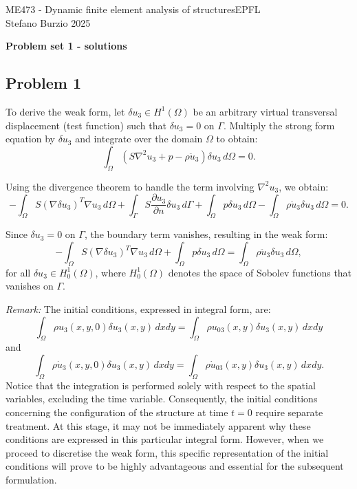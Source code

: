 \documentclass[12pt]{article}
\begin{document}
\noindent ME473 - Dynamic finite element analysis of structures\hfill EPFL\\
Stefano Burzio \hfill 2025\\
\vspace{0.3cm}

\hspace*{\fill}\textbf{\Large Problem set 1 - solutions}\hspace*{\fill}

\hrulefill

\subsection*{Problem 1}
To derive the weak form, let \( \delta u_3 \in H^1(\Omega) \) be an arbitrary virtual transversal displacement (test function) such that \( \delta u_3 = 0 \) on \( \Gamma \). Multiply the strong form equation by \( \delta u_3 \) and integrate over the domain \( \Omega \) to obtain:
\[
    \int_{\Omega} \left( S \nabla^2 u_3 + p - \rho \ddot{u}_3 \right) \delta u_3 \, d\Omega = 0.
\]

Using the divergence theorem to handle the term involving \( \nabla^2 u_3 \), we obtain:
\[
    -\int_{\Omega} S (\nabla \delta u_3)^{T}\nabla u_3 \, d\Omega + \int_{\Gamma} S \frac{\partial u_3}{\partial n} \delta u_3 \, d\Gamma + \int_{\Omega} p \delta u_3 \, d\Omega - \int_{\Omega} \rho \ddot{u}_3\delta u_3 \, d\Omega = 0.
\]

Since \( \delta u_3 = 0 \) on \( \Gamma \), the boundary term vanishes, resulting in the weak form:
\[
    -\int_{\Omega} S (\nabla \delta u_3)^{T}\nabla u_3 \, d\Omega + \int_{\Omega} p \delta u_3 \, d\Omega = \int_{\Omega} \rho \ddot{u}_3 \delta u_3 \, d\Omega,
\]
for all \( \delta u_3 \in H^1_0(\Omega) \), where \( H^1_0(\Omega) \) denotes the space of Sobolev functions that vanishes on \( \Gamma \).

\emph{Remark:} The initial conditions, expressed in integral form, are:
\[
    \int_{\Omega} \rho u_3(x, y, 0) \delta u_3(x, y)\, dxdy =\int_{\Omega} \rho u_{03}(x, y)\delta u_3(x, y)\, dxdy
\]
and
\[
    \int_{\Omega} \rho \dot{u}_3(x, y, 0) \delta u_3(x, y)\, dxdy =\int_{\Omega} \rho \dot{u}_{03}(x, y)\delta u_3(x, y)\, dxdy.
\]
Notice that the integration is performed solely with respect to the spatial variables, excluding the time variable. Consequently, the initial conditions concerning the configuration of the structure at time \( t = 0 \) require separate treatment. At this stage, it may not be immediately apparent why these conditions are expressed in this particular integral form. However, when we proceed to discretise the weak form, this specific representation of the initial conditions will prove to be highly advantageous and essential for the subsequent formulation.
\end{document}
